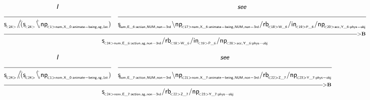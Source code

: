 \documentclass{article}
\newcommand{\deriv}[2]
{  \renewcommand{\arraystretch}{.5}
$\begin{array}[t]{*{#1}{c}}
     #2
   \end{array}$ }
\newcommand{\gf}[1]{\textsf{\textsl{#1}}}
\newcommand{\cf}[1]{\mbox{\ensuremath{\cfont{#1}}}}
\newcommand{\uline}[1]
{\mc{#1}{\hrulefill} }
\newcommand{\mc}[2]
  {\multicolumn{#1}{c}{#2}}
\newcommand{\cfont}{\mathsf}
\newcommand{\bs}{\backslash}
\newcommand{\subsa}[1]{\hspace{-0.75mm}_{_{#1}}}
\newcommand{\subsb}[1]{\hspace{-0.10mm}_{_{#1}}}
\newcommand{\subsf}[1]{\hspace{-0.75mm}_{_{#1}}}
\newcommand{\supsa}[1]{\hspace{-1.75mm}^{^{#1}} }
\newcommand{\supsb}[1]{\hspace{-0.80mm}^{^{#1}}  }
\begin{document}
\vspace{5mm}

\deriv{2}{
\gf{I} & \gf{see} \\
\uline{1} & \uline{1} \\
\cf{s \subsf{ < 24 > } / \supsb{+} \hspace{-1.45mm} \subsa{i} (s \subsf{ < 24 > } \bs \supsa{+} \hspace{-0.50mm} \subsb{i} np \subsf{   < 1 >  nom ,  X \_ 0:animate-being ,  sg ,  1st } )} & \cf{s \subsf{  nom ,  E \_ 6:action ,  NUM ,  non-3rd } \bs np \subsf{   < 17 >  nom ,  X \_ 6:animate-being ,  NUM ,  non-3rd } / rb \subsf{   < 18 >  W \_ 6 } / in \subsf{   < 19 >  P \_ 6 } / np \subsf{   < 20 >  acc ,  Y \_ 6:phys-obj } } \\
 \mc{2} {\hrulefill_{>\mathbf{B}}}\\
 \mc{2}{\cf{s \subsf{   < 24 >  nom ,  E \_ 6:action ,  sg ,  non-3rd } / rb \subsf{   < 18 >  W \_ 6 } / in \subsf{   < 19 >  P \_ 6 } / np \subsf{   < 20 >  acc ,  Y \_ 6:phys-obj } }} \\
}

\vspace{5mm}

\deriv{2}{
\gf{I} & \gf{see} \\
\uline{1} & \uline{1} \\
\cf{s \subsf{ < 24 > } / \supsb{+} \hspace{-1.45mm} \subsa{i} (s \subsf{ < 24 > } \bs \supsa{+} \hspace{-0.50mm} \subsb{i} np \subsf{   < 1 >  nom ,  X \_ 0:animate-being ,  sg ,  1st } )} & \cf{s \subsf{  nom ,  E \_ 7:action ,  NUM ,  non-3rd } \bs np \subsf{   < 21 >  nom ,  X \_ 7:animate-being ,  NUM ,  non-3rd } / rb \subsf{   < 22 >  Z \_ 7 } / np \subsf{   < 23 >  Y \_ 7:phys-obj } } \\
 \mc{2} {\hrulefill_{>\mathbf{B}}}\\
 \mc{2}{\cf{s \subsf{   < 24 >  nom ,  E \_ 7:action ,  sg ,  non-3rd } / rb \subsf{   < 22 >  Z \_ 7 } / np \subsf{   < 23 >  Y \_ 7:phys-obj } }} \\
}

\vspace{5mm}
\end{document}

